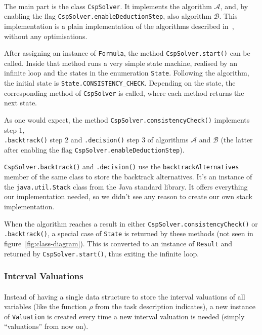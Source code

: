 \paragraph{}
The main part is the class \texttt{CspSolver}.
It implements the algorithm $\mathcal{A}$, and, by enabling the flag \texttt{CspSolver.enableDeductionStep}, also algorithm $\mathcal{B}$. This implementation is a plain implementation of the algorithms described in~\cite{MF19}, without any optimisations.

After assigning an instance of \texttt{Formula}, the method \texttt{CspSolver.start()} can be called.
Inside that method runs a very simple state machine, realised by an infinite loop and the states in the enumeration \texttt{State}.
Following the algorithm, the initial state is \texttt{State.CONSISTENCY\_CHECK}.
Depending on the state, the corresponding method of \texttt{CspSolver} is called, where each method returns the next state.

As one would expect, the method \texttt{CspSolver.consistencyCheck()} implements step 1,\\ \texttt{.backtrack()} step 2 and \texttt{.decision()} step 3 of algorithms $\mathcal{A}$ and $\mathcal{B}$ (the latter after enabling the flag \texttt{CspSolver.enableDeductionStep}).

\texttt{CspSolver.backtrack()} and \texttt{.decision()} use the \texttt{backtrackAlternatives} member of the same class to store the backtrack alternatives.
It's an instance of the \texttt{java.util.Stack} class from the Java standard library.
It offers everything our implementation needed, so we didn't see any reason to create our own stack implementation.

When the algorithm reaches a result in either \texttt{CspSolver.consistencyCheck()} or\\ \texttt{.backtrack()}, a special case of \texttt{State} is returned by these methods (not seen in figure~\ref{fig:class-diagram}).
This is converted to an instance of \texttt{Result} and returned by \texttt{CspSolver.start()}, thus exiting the infinite loop.


\subsubsection{Interval Valuations}\label{ssec:valuations}

\paragraph{}
Instead of having a single data structure to store the interval valuations of all variables (like the function $\rho$ from the task description indicates), a new instance of \texttt{Valuation} is created every time a new interval valuation is needed (simply ``valuations'' from now on).

